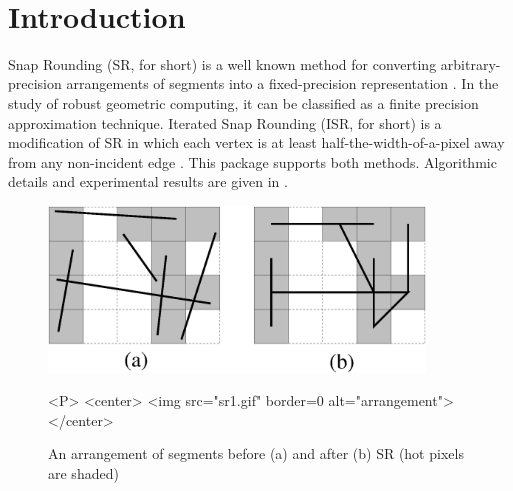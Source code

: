 
\ccParDims


\\
\newcommand{\reals}{{\rm I\!\hspace{-0.025em} R}}
\def\A{{\cal A}}
\def\S{{\cal S}}

\section{Introduction}
Snap Rounding (SR, for short) is a well known method for converting
arbitrary-precision arrangements of segments into a fixed-precision
representation \cite{gght-srlse-97, gm-rad-98, h-psifp-99}. In the study of robust
geometric computing, it can be classified
as a finite precision approximation technique. Iterated Snap Rounding
(ISR, for short) is
a modification of SR in which each vertex is at least
half-the-width-of-a-pixel away from any non-incident edge \cite{isr-2002}.
This package supports both methods. Algorithmic details and experimental results are
given in \cite{isr-2002}.

\begin{figure}
\begin{ccTexOnly}
\centerline{\includegraphics[width=10cm]{Snap_rounding_2/sr1.ps}}
\end{ccTexOnly}

\caption{An arrangement of segments before (a) and after (b)
SR (hot pixels are shaded)}
\label{fig:sr1}

\begin{ccHtmlOnly}
<P>
<center>
  <img src="sr1.gif"  border=0 alt="arrangement">
</center>
\end{ccHtmlOnly}
\end{figure}

